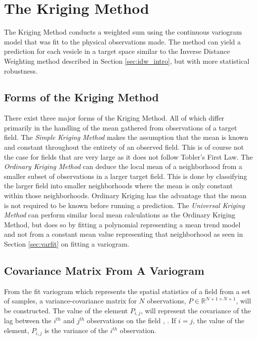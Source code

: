 \section{The Kriging Method}
The Kriging Method conducts a weighted sum using the continuous variogram model that was fit to the physical observations made. The method can yield a prediction for each vesicle in a target space similar to the Inverse Distance Weighting method described in Section \ref{sec:idw_intro}, but with more statistical robustness.

\subsection{Forms of the Kriging Method}
There exist three major forms of the Kriging Method. All of which differ primarily in the handling of the mean gathered from observations of a target field. The \textit{Simple Kriging Method} makes the assumption that the mean is known and constant throughout the entirety of an observed field. This is of course not the case for fields that are very large as it does not follow Tobler's First Law. The \textit{Ordinary Kriging Method} can deduce the local mean of a neighborhood from a smaller subset of observations in a larger target field. This is done by classifying the larger field into smaller neighborhoods where the mean is only constant within those neighborhoods. Ordinary Kriging has the advantage that the mean is not required to be known before running a prediction. The \textit{Universal Kriging Method} can perform similar local mean calculations as the Ordinary Kriging Method, but does so by fitting a polynomial representing a mean trend model and not from a constant mean value representing that neighborhood \cite{vandergraaf:nnkrig} as seen in Section \ref{sec:varfit} on fitting a variogram.

\subsection{Covariance Matrix From A Variogram} \label{sec:covmat}
From the fit variogram which represents the spatial statistics of a field from a set of samples, a variance-covariance matrix for $N$ observations, $P \in \mathbb{R}^{N+1 \times N+1}$, will be constructed. The value of the element $P_{i,j}$, will represent the covariance of the lag between the $i^{th}$ and $j^{th}$ observations on the field \cite{goov:97}, \cite{matheron:geostat}. If $i=j$, the value of the element, $P_{i,j}$ is the variance of the $i^{th}$ observation. 

